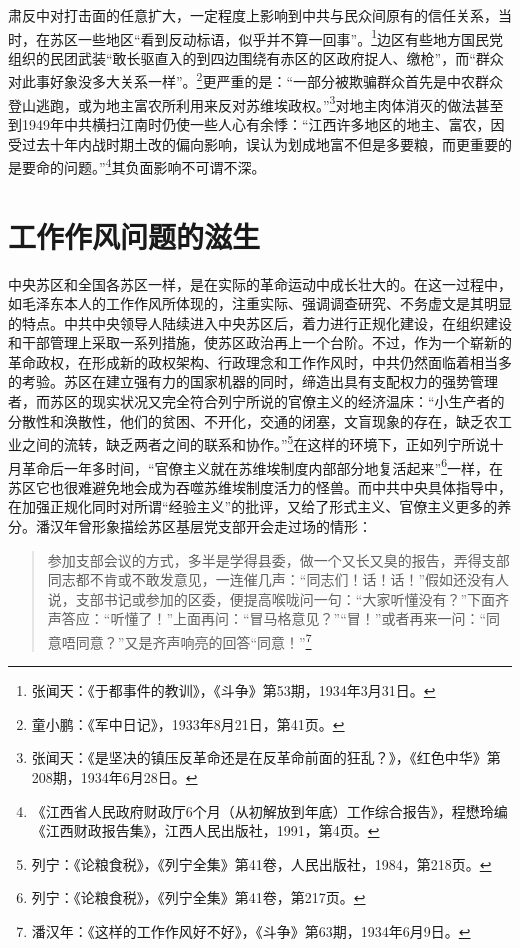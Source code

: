 肃反中对打击面的任意扩大，一定程度上影响到中共与民众间原有的信任关系，当时，在苏区一些地区“看到反动标语，似乎并不算一回事”。\footnote{张闻天：《于都事件的教训》，《斗争》第53期，1934年3月31日。}边区有些地方国民党组织的民团武装“敢长驱直入的到四边围绕有赤区的区政府捉人、缴枪”，而“群众对此事好象没多大关系一样”。\footnote{童小鹏：《军中日记》，1933年8月21日，第41页。}更严重的是：“一部分被欺骗群众首先是中农群众登山逃跑，或为地主富农所利用来反对苏维埃政权。”\footnote{张闻天：《是坚决的镇压反革命还是在反革命前面的狂乱？》，《红色中华》第208期，1934年6月28日。}对地主肉体消灭的做法甚至到1949年中共横扫江南时仍使一些人心有余悸：“江西许多地区的地主、富农，因受过去十年内战时期土改的偏向影响，误认为划成地富不但是多要粮，而更重要的是要命的问题。”\footnote{《江西省人民政府财政厅6个月（从初解放到年底）工作综合报告》，程懋玲编《江西财政报告集》，江西人民出版社，1991，第4页。}其负面影响不可谓不深。

\section{工作作风问题的滋生}


中央苏区和全国各苏区一样，是在实际的革命运动中成长壮大的。在这一过程中，如毛泽东本人的工作作风所体现的，注重实际、强调调查研究、不务虚文是其明显的特点。中共中央领导人陆续进入中央苏区后，着力进行正规化建设，在组织建设和干部管理上采取一系列措施，使苏区政治再上一个台阶。不过，作为一个崭新的革命政权，在形成新的政权架构、行政理念和工作作风时，中共仍然面临着相当多的考验。苏区在建立强有力的国家机器的同时，缔造出具有支配权力的强势管理者，而苏区的现实状况又完全符合列宁所说的官僚主义的经济温床：“小生产者的分散性和涣散性，他们的贫困、不开化，交通的闭塞，文盲现象的存在，缺乏农工业之间的流转，缺乏两者之间的联系和协作。”\footnote{列宁：《论粮食税》，《列宁全集》第41卷，人民出版社，1984，第218页。}在这样的环境下，正如列宁所说十月革命后一年多时间，“官僚主义就在苏维埃制度内部部分地复活起来”\footnote{列宁：《论粮食税》，《列宁全集》第41卷，第217页。}一样，在苏区它也很难避免地会成为吞噬苏维埃制度活力的怪兽。而中共中央具体指导中，在加强正规化同时对所谓“经验主义”的批评，又给了形式主义、官僚主义更多的养分。潘汉年曾形象描绘苏区基层党支部开会走过场的情形：

\begin{quote}

参加支部会议的方式，多半是学得县委，做一个又长又臭的报告，弄得支部同志都不肯或不敢发意见，一连催几声：“同志们！话！话！”假如还没有人说，支部书记或参加的区委，便提高喉咙问一句：“大家听懂没有？”下面齐声答应：“听懂了！”上面再问：“冒马格意见？”“冒！”或者再来一问：“同意唔同意？”又是齐声响亮的回答“同意！”\footnote{潘汉年：《这样的工作作风好不好》，《斗争》第63期，1934年6月9日。}
\end{quote}


